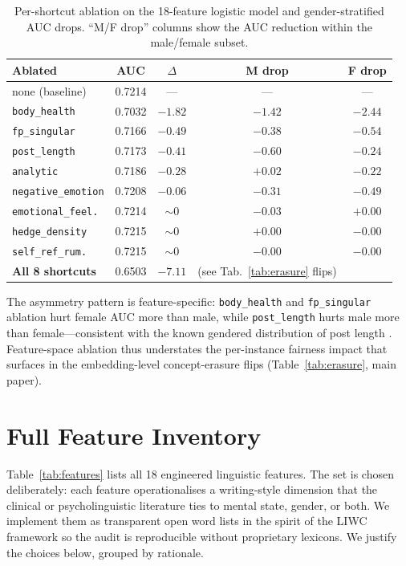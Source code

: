 \documentclass[11pt]{article}
\begin{document}
\begin{table}[t]
\centering
\small
\caption{Per-shortcut ablation on the 18-feature logistic model and gender-stratified AUC drops. ``M/F drop'' columns show the AUC reduction within the male/female subset.}
\label{tab:ablation}
\begin{tabular}{lcccc}
\toprule
\textbf{Ablated} & \textbf{AUC} & $\Delta$ & \textbf{M drop} & \textbf{F drop} \\
\midrule
none (baseline)            & 0.7214 & ---      & ---     & ---     \\
\texttt{body\_health}      & 0.7032 & $-1.82$ & $-1.42$ & $-2.44$ \\
\texttt{fp\_singular}      & 0.7166 & $-0.49$ & $-0.38$ & $-0.54$ \\
\texttt{post\_length}      & 0.7173 & $-0.41$ & $-0.60$ & $-0.24$ \\
\texttt{analytic}          & 0.7186 & $-0.28$ & $+0.02$ & $-0.22$ \\
\texttt{negative\_emotion} & 0.7208 & $-0.06$ & $-0.31$ & $-0.49$ \\
\texttt{emotional\_feel.}  & 0.7214 & $\sim 0$ & $-0.03$ & $+0.00$ \\
\texttt{hedge\_density}    & 0.7215 & $\sim 0$ & $+0.00$ & $-0.00$ \\
\texttt{self\_ref\_rum.}   & 0.7215 & $\sim 0$ & $-0.00$ & $-0.00$ \\
\midrule
\textbf{All 8 shortcuts}   & 0.6503 & $-7.11$ & (see Tab.~\ref{tab:erasure} flips) \\
\bottomrule
\end{tabular}
\end{table}

The asymmetry pattern is feature-specific: \texttt{body\_health} and \texttt{fp\_singular} ablation hurt female AUC more than male, while \texttt{post\_length} hurts male more than female---consistent with the known gendered distribution of post length \citep{newman2008gender}. Feature-space ablation thus understates the per-instance fairness impact that surfaces in the embedding-level concept-erasure flips (Table~\ref{tab:erasure}, main paper).

\section{Full Feature Inventory}
\label{sec:features}

Table~\ref{tab:features} lists all 18 engineered linguistic features. The set is chosen deliberately: each feature operationalises a writing-style dimension that the clinical or psycholinguistic literature ties to mental state, gender, or both. We implement them as transparent open word lists in the spirit of the LIWC framework \citep{tausczik2010liwc} so the audit is reproducible without proprietary lexicons. We justify the choices below, grouped by rationale.
\end{document}
